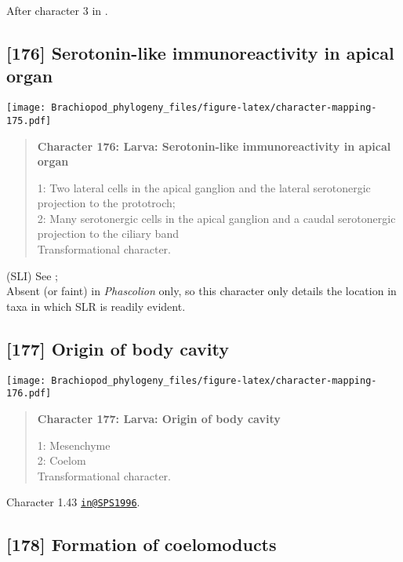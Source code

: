 \documentclass[openany]{book}
\theoremstyle{definition}
\theoremstyle{definition}
\theoremstyle{definition}
\theoremstyle{remark}
\begin{document}
After character 3 in \citet{Richter2010}.

\subsection*{{[}176{]} Serotonin-like immunoreactivity in apical
organ}\label{serotonin-like-immunoreactivity-in-apical-organ}

\texttt{[image: Brachiopod\_phylogeny\_files/figure-latex/character-mapping-175.pdf]}

\begin{quote}
\textbf{Character 176: Larva: Serotonin-like immunoreactivity in apical
organ}

1: Two lateral cells in the apical ganglion and the lateral serotonergic
projection to the prototroch;\\
2: Many serotonergic cells in the apical ganglion and a caudal
serotonergic projection to the ciliary band\\
Transformational character.
\end{quote}

(SLI) See \citet{Haszprunar2000}; \citet{Richter2010}\\
Absent (or faint) in \emph{Phascolion} only, so this character only
details the location in taxa in which SLR is readily evident.

\subsection*{{[}177{]} Origin of body
cavity}\label{origin-of-body-cavity}

\texttt{[image: Brachiopod\_phylogeny\_files/figure-latex/character-mapping-176.pdf]}

\begin{quote}
\textbf{Character 177: Larva: Origin of body cavity}

1: Mesenchyme\\
2: Coelom\\
Transformational character.
\end{quote}

Character 1.43 \href{mailto:in@SPS1996}{\nolinkurl{in@SPS1996}}.

\subsection*{{[}178{]} Formation of
coelomoducts}\label{formation-of-coelomoducts}
\end{document}
